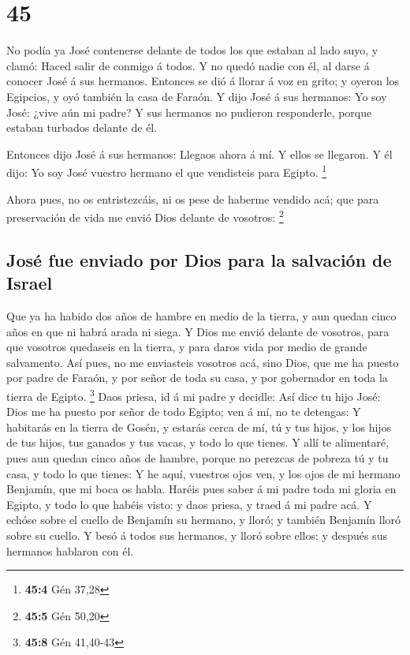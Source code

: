 \hypertarget{section-44}{%
\section{45}\label{section-44}}

 No podía ya José contenerse delante de todos los que
estaban al lado suyo, y clamó: Haced salir de conmigo á todos. Y no
quedó nadie con él, al darse á conocer José á sus hermanos.
 Entonces se dió á llorar á voz en grito; y oyeron los
Egipcios, y oyó también la casa de Faraón.  Y dijo José á
sus hermanos: Yo soy José: ¿vive aún mi padre? Y sus hermanos no
pudieron responderle, porque estaban turbados delante de él.

 Entonces dijo José á sus hermanos: Llegaos ahora á mí. Y
ellos se llegaron. Y él dijo: Yo soy José vuestro hermano el que
vendisteis para Egipto. \footnote{\textbf{45:4} Gén 37,28}

 Ahora pues, no os entristezcáis, ni os pese de haberme
vendido acá; que para preservación de vida me envió Dios delante de
vosotros: \footnote{\textbf{45:5} Gén 50,20}

\hypertarget{josuxe9-fue-enviado-por-dios-para-la-salvaciuxf3n-de-israel}{%
\subsection{José fue enviado por Dios para la salvación de
Israel}\label{josuxe9-fue-enviado-por-dios-para-la-salvaciuxf3n-de-israel}}

 Que ya ha habido dos años de hambre en medio de la
tierra, y aun quedan cinco años en que ni habrá arada ni siega.
 Y Dios me envió delante de vosotros, para que vosotros
quedaseis en la tierra, y para daros vida por medio de grande
salvamento.  Así pues, no me enviasteis vosotros acá, sino
Dios, que me ha puesto por padre de Faraón, y por señor de toda su casa,
y por gobernador en toda la tierra de Egipto. \footnote{\textbf{45:8}
  Gén 41,40-43}  Daos priesa, id á mi padre y decidle: Así
dice tu hijo José: Dios me ha puesto por señor de todo Egipto; ven á mí,
no te detengas:  Y habitarás en la tierra de Gosén, y
estarás cerca de mí, tú y tus hijos, y los hijos de tus hijos, tus
ganados y tus vacas, y todo lo que tienes.  Y allí te
alimentaré, pues aun quedan cinco años de hambre, porque no perezcas de
pobreza tú y tu casa, y todo lo que tienes:  Y he aquí,
vuestros ojos ven, y los ojos de mi hermano Benjamín, que mi boca os
habla.  Haréis pues saber á mi padre toda mi gloria en
Egipto, y todo lo que habéis visto: y daos priesa, y traed á mi padre
acá.  Y echóse sobre el cuello de Benjamín su hermano, y
lloró; y también Benjamín lloró sobre su cuello.  Y besó
á todos sus hermanos, y lloró sobre ellos: y después sus hermanos
hablaron con él.

